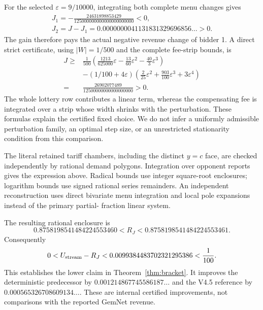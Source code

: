 For the selected $\varepsilon=9/10000$, integrating both complete menu
changes gives
\[
\begin{gathered}
 J_1=-\frac{24631898853429}{125000000000000000000000}<0,\\
 J_2=J-J_1=0.0000000041131831329696856\ldots>0.
\end{gathered}
\]
The gain therefore pays the actual negative revenue change of bidder 1.
A direct strict certificate, using $|W|=1/500$ and the complete fee-strip
bounds, is
\[
\begin{split}
J\ge{}&\frac1{500}\left(\frac{1213}{625000}\varepsilon
 -\frac{13}{60}\varepsilon^2-\frac{40}{3}\varepsilon^3\right)\\
&-(1/100+4\varepsilon)\left(\frac2{25}\varepsilon^2
 +\frac{903}{100}\varepsilon^3+3\varepsilon^4\right)\\
={}&\frac{26902077489}{12500000000000000000}>0.
\end{split}
\]
The whole lottery row contributes a linear term, whereas the compensating
fee is integrated over a strip whose width shrinks with the perturbation.
These formulas explain the certified fixed choice. We do not infer a
uniformly admissible perturbation family, an optimal step size, or an
unrestricted stationarity condition from this comparison.

The literal retained tariff chambers, including the distinct $y=c$ face,
are checked independently by rational demand polygons. Integration over
opponent reports gives the expression above. Radical bounds use integer
square-root enclosures; logarithm bounds use signed rational series
remainders. An independent reconstruction uses direct bivariate menu
integration and local pole expansions instead of the primary partial-
fraction linear system.

The resulting rational enclosure is
\[
0.8758198541484224553460<R_J<0.8758198541484224553461.
\]
Consequently
\[
0<U_{\rm stream}-R_J<0.0099384483702321295386<\frac1{100}.
\]
This establishes the lower claim in Theorem~\ref{thm:bracket}. It improves
the deterministic predecessor by $0.001214867745586187\ldots$ and the
V4.5 reference by $0.000565326708609134\ldots$. These are internal certified
improvements, not comparisons with the reported GemNet revenue.
